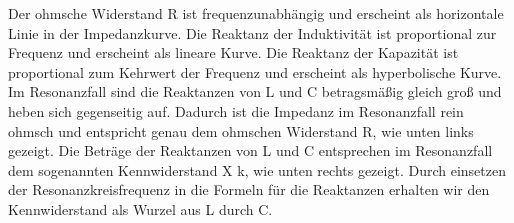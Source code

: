 \begin{frame}
{Der ohmsche Widerstand R ist frequenzunabhängig und erscheint als horizontale Linie in der Impedanzkurve.
Die Reaktanz der Induktivität ist proportional zur Frequenz und erscheint als lineare Kurve.
Die Reaktanz der Kapazität ist proportional zum Kehrwert der Frequenz und erscheint als hyperbolische Kurve.
Im Resonanzfall sind die Reaktanzen von L und C betragsmäßig gleich groß und heben sich gegenseitig auf.
Dadurch ist die Impedanz im Resonanzfall rein ohmsch und entspricht genau dem ohmschen Widerstand R, wie unten links gezeigt. 
Die Beträge der Reaktanzen von L und C entsprechen im Resonanzfall dem sogenannten Kennwiderstand X k, wie unten rechts gezeigt. 
Durch einsetzen der Resonanzkreisfrequenz in die Formeln für die Reaktanzen erhalten wir den Kennwiderstand als Wurzel aus L durch C. 
}%
\end{frame}


